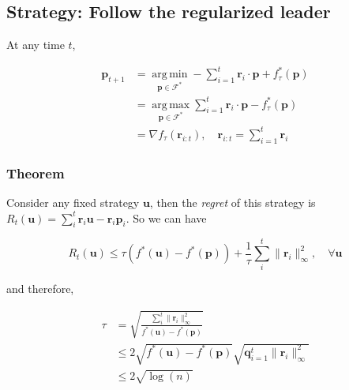 \documentclass[10pt]{article}
\newcommand{\argmax}{\operatorname{arg\,max}}
\newcommand{\argmin}{\operatorname{arg\,min}}
\theoremstyle{definition}
\begin{document}
\subsection*{Strategy: Follow the regularized leader}

At any time $t$,

\begin{equation*}
\begin{aligned}
\mathbf{p}_{t+1} & = \argmin\limits_{\mathbf{p} \in \mathcal{F}^*} - \sum\limits^t_{i=1} \mathbf{r}_i \cdot \mathbf{p} + f^*_{\tau}(\mathbf{p}) \\
& = \argmax\limits_{\mathbf{p} \in \mathcal{F}^*} \sum\limits^t_{i=1} \mathbf{r}_i \cdot \mathbf{p} - f^*_{\tau}(\mathbf{p}) \\
& = \nabla f_{\tau}(\mathbf{r}_{i:t}), \quad \mathbf{r}_{i:t} = \sum\limits^t_{i=1} \mathbf{r}_i
\end{aligned}
\end{equation*}

\subsubsection*{Theorem}

Consider any fixed strategy $\mathbf{u}$, then the \emph{regret} of this strategy is $R_t(\mathbf{u}) = \sum\limits^t_i \mathbf{r}_i \mathbf{u} - \mathbf{r}_i \mathbf{p}_i$. So we can have

\begin{equation*}
R_t(\mathbf{u}) \leq \tau(f^*(\mathbf{u}) - f^*(\mathbf{p})) + \frac{1}{\tau} \sum\limits^t_i \lVert\mathbf{r}_i \rVert^2_\infty, \quad \forall \mathbf{u}
\end{equation*}

\noindent
and therefore,

\begin{equation*}
\begin{aligned}
\tau & = \sqrt{\frac{\sum_i^t\lVert\mathbf{r}_i \rVert^2_\infty}{f^*(\mathbf{u}) - f^*(\mathbf{p})}} \\
& \leq 2\sqrt{f^*(\mathbf{u}) - f^*(\mathbf{p})}\sqrt{\mathbf{q}^t_{i=1} \lVert\mathbf{r}_i \rVert^2_\infty} \\
& \leq 2\sqrt{\log(n)}
\end{aligned}
\end{equation*}
\end{document}
